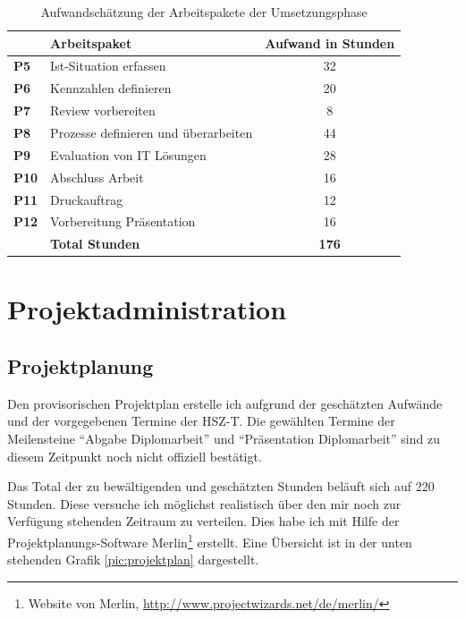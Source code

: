 \begin{table}[htbp]
\begin{center}
    \begin{tabular}{llc}
        \toprule & \textbf{Arbeitspaket} & \textbf{Aufwand in Stunden} \\
        \midrule \textbf{P5} & Ist-Situation erfassen & 32 \\
        \midrule \textbf{P6} & Kennzahlen definieren & 20 \\
        \midrule \textbf{P7} & Review vorbereiten & 8 \\
        \midrule \textbf{P8} & Prozesse definieren und überarbeiten & 44 \\
        \midrule \textbf{P9} & Evaluation von IT Lösungen & 28 \\
        \midrule \textbf{P10} & Abschluss Arbeit & 16 \\
        \midrule \textbf{P11} & Druckauftrag & 12 \\
        \midrule \textbf{P12} & Vorbereitung Präsentation & 16 \\
        \bottomrule & \textbf{Total Stunden} & \textbf{176} \\
        \bottomrule
    \end{tabular}
    \caption{Aufwandschätzung der Arbeitspakete der Umsetzungsphase}
    \label{tab:aufwand_umsetzungsphase}
\end{center}
\end{table}

\chapter{Projektadministration}
\section{Projektplanung}
Den provisorischen Projektplan erstelle ich aufgrund der geschätzten Aufwände
und der vorgegebenen Termine der HSZ-T. Die gewählten Termine der Meilensteine
``Abgabe Diplomarbeit'' und ``Präsentation Diplomarbeit'' sind zu diesem Zeitpunkt
noch nicht offiziell bestätigt.

Das Total der zu bewältigenden und geschätzten Stunden beläuft sich 
auf 220 Stunden. Diese versuche ich möglichst realistisch über den mir noch
zur Verfügung stehenden Zeitraum zu verteilen. Dies habe ich mit Hilfe der 
Projektplanungs-Software Merlin\footnote{Website von Merlin, \url{http://www.projectwizards.net/de/merlin/}} 
erstellt. Eine Übersicht ist in der unten stehenden Grafik \ref{pic:projektplan} 
dargestellt.

